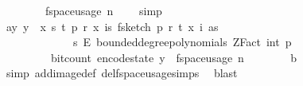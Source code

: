 \begin{isabellebody}
\ \ \ \ \ \ \ \ f{}{\isacharunderscore}{\kern0pt}space{\isacharunderscore}{\kern0pt}usage\ {\isacharparenleft}{\kern0pt}n{\isacharcomma}{\kern0pt}\ {\isasymepsilon}{\isacharcomma}{\kern0pt}\ {\isasymdelta}{\isacharparenright}{\kern0pt}{\isachardoublequoteclose}\ \isamarkupfalse%
\ simp\isanewline
\ \ \isamarkupfalse%
\isanewline
\ \ \isanewline
\ \ \isamarkupfalse%
\ a{\isacharcolon}{\kern0pt}{\isachardoublequoteopen}{\isasymAnd}y{\isachardot}{\kern0pt}\ y\ {\isasymin}\ {\isacharparenleft}{\kern0pt}{\isasymlambda}x{\isachardot}{\kern0pt}\ {\isacharparenleft}{\kern0pt}s{\isacharcomma}{\kern0pt}\ t{\isacharcomma}{\kern0pt}\ p{\isacharcomma}{\kern0pt}\ r{\isacharcomma}{\kern0pt}\ x{\isacharcomma}{\kern0pt}\ {\isasymlambda}i{\isasymin}{\isacharbraceleft}{\kern0pt}{}{\isachardot}{\kern0pt}{\isachardot}{\kern0pt}{\isacharless}{\kern0pt}s{\isacharbraceright}{\kern0pt}{\isachardot}{\kern0pt}\ f{}{\isacharunderscore}{\kern0pt}sketch\ p\ r\ t\ {\isacharparenleft}{\kern0pt}x\ i{\isacharparenright}{\kern0pt}\ as{\isacharparenright}{\kern0pt}{\isacharparenright}{\kern0pt}\ {\isacharbackquote}{\kern0pt}\isanewline
\ \ \ \ \ \ \ \ \ \ \ \ \ {\isacharparenleft}{\kern0pt}{\isacharbraceleft}{\kern0pt}{}{\isachardot}{\kern0pt}{\isachardot}{\kern0pt}{\isacharless}{\kern0pt}s{\isacharbraceright}{\kern0pt}\ {\isasymrightarrow}\isactrlsub E\ bounded{\isacharunderscore}{\kern0pt}degree{\isacharunderscore}{\kern0pt}polynomials\ {\isacharparenleft}{\kern0pt}ZFact\ {\isacharparenleft}{\kern0pt}int\ p{\isacharparenright}{\kern0pt}{\isacharparenright}{\kern0pt}\ {}{\isacharparenright}{\kern0pt}\ {\isasymLongrightarrow}\isanewline
\ \ \ \ \ \ \ \ \ bit{\isacharunderscore}{\kern0pt}count\ {\isacharparenleft}{\kern0pt}encode{\isacharunderscore}{\kern0pt}state\ y{\isacharparenright}{\kern0pt}\ {\isasymle}\ f{}{\isacharunderscore}{\kern0pt}space{\isacharunderscore}{\kern0pt}usage\ {\isacharparenleft}{\kern0pt}n{\isacharcomma}{\kern0pt}\ {\isasymepsilon}{\isacharcomma}{\kern0pt}\ {\isasymdelta}{\isacharparenright}{\kern0pt}{\isachardoublequoteclose}\isanewline
\ \ \ \ \isamarkupfalse%
\ b\ \isamarkupfalse%
\ {\isacharparenleft}{\kern0pt}simp\ add{\isacharcolon}{\kern0pt}image{\isacharunderscore}{\kern0pt}def\ del{\isacharcolon}{\kern0pt}f{}{\isacharunderscore}{\kern0pt}space{\isacharunderscore}{\kern0pt}usage{\isachardot}{\kern0pt}simps{\isacharparenright}{\kern0pt}\ \isamarkupfalse%
\ blast\isanewline
\isanewline

\end{isabellebody}
